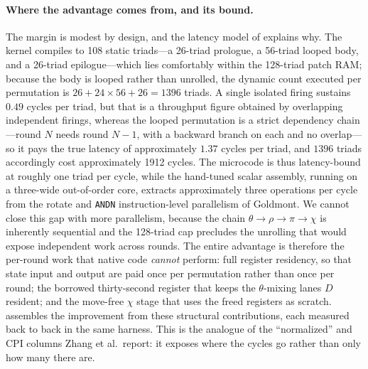 \paragraph{Where the advantage comes from, and its bound.}
The margin is modest by design, and the latency model of 
explains why. The kernel compiles to 108 static triads---a 26-triad prologue, a
56-triad looped body, and a 26-triad epilogue---which lies comfortably within the
128-triad patch RAM; because the body is looped rather than unrolled, the dynamic
count executed per permutation is $26 + 24\times56 + 26 = 1396$ triads. A single
isolated firing sustains $0.49$ cycles per triad, but that is a throughput figure
obtained by overlapping independent firings, whereas the looped permutation is a
strict dependency chain---round $N$ needs round $N{-}1$, with a backward branch on
each and no overlap---so it pays the true latency of approximately $1.37$ cycles
per triad, and $1396$ triads accordingly cost approximately 1912 cycles. The
microcode is thus latency-bound at roughly one triad per cycle, while the
hand-tuned scalar assembly, running on a three-wide out-of-order core, extracts
approximately three operations per cycle from the rotate and \texttt{ANDN}
instruction-level parallelism of Goldmont. We cannot close this gap with more
parallelism, because the chain $\theta\!\to\!\rho\!\to\!\pi\!\to\!\chi$ is
inherently sequential and the 128-triad cap precludes the unrolling that would
expose independent work across rounds. The entire advantage is therefore the
per-round work that native code \emph{cannot} perform: full register residency, so
that state input and output are paid once per permutation rather than once per
round; the borrowed thirty-second register that keeps the $\theta$-mixing lanes
$D$ resident; and the move-free $\chi$ stage that uses the freed registers as
scratch.  assembles the improvement from these
structural contributions, each measured back to back in the same harness. This is
the analogue of the ``normalized'' and CPI columns Zhang et al.\ report: it
exposes where the cycles go rather than only how many there are.

